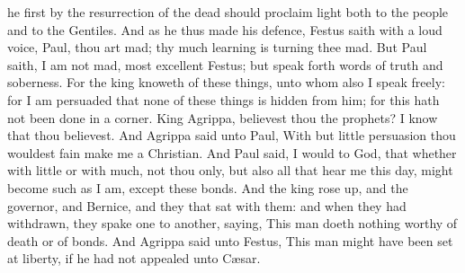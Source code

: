 he first by the resurrection of the dead should proclaim light both to the people and to the Gentiles.  And as he thus made his defence, Festus saith with a loud voice, Paul, thou art mad; thy much learning is turning thee mad. But Paul saith, I am not mad, most excellent Festus; but speak forth words of truth and soberness. For the king knoweth of these things, unto whom also I speak freely: for I am persuaded that none of these things is hidden from him; for this hath not been done in a corner. King Agrippa, believest thou the prophets? I know that thou believest. And Agrippa said unto Paul, With but little persuasion thou wouldest fain make me a Christian. And Paul said, I would to God, that whether with little or with much, not thou only, but also all that hear me this day, might become such as I am, except these bonds.  And the king rose up, and the governor, and Bernice, and they that sat with them: and when they had withdrawn, they spake one to another, saying, This man doeth nothing worthy of death or of bonds. And Agrippa said unto Festus, This man might have been set at liberty, if he had not appealed unto Cæsar. 

